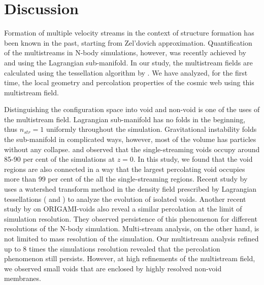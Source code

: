 \section{Discussion}
\label{sec:discussion}


Formation of multiple velocity streams in the context of structure formation has been known in the past, starting from Zel'dovich approximation. Quantification of the multistreams in N-body simulations, however, was recently achieved by \cite{Shandarin2012} and \cite{Abel2012} using the Lagrangian sub-manifold. In our study, the multistream fields are calculated using the tessellation algorithm by \cite{Shandarin2012}. We have analyzed, for the first time, the local geometry and percolation properties of the cosmic web using this multistream field.   

Distinguishing the configuration space into void and non-void is one of the uses of the multistream field. Lagrangian sub-manifold has no folds in the beginning, thus $n_{str} = 1$ uniformly throughout the simulation. Gravitational instability folds the sub-manifold in complicated ways, however, most of the volume has particles without any collapse. \cite{Shandarin2012} and \cite{Ramachandra2015} observed that the single-streaming voids occupy around 85-90 per cent of the simulations at $z=0$. In this study, we found that the void regions are also connected in a way that the largest percolating void occupies more than 99 per cent of the all the single-streaming regions. Recent study by \cite{Wojtak2016a} uses a watershed transform method in the density field prescribed by Lagrangian tessellations (\citealt{Shandarin2012} and \citealt{Abel2012}) to analyze the evolution of isolated voids. Another recent study by \cite{Falck2015} on ORIGAMI-voids also reveal a similar percolation at the limit of simulation resolution. They observed persistence of this phenomenon for different resolutions of the N-body simulation. Multi-stream analysis, on the other hand, is not limited to mass resolution of the simulation. Our multistream analysis refined up to 8 times the simulations resolution revealed that the percolation phenomenon still persists. However, at high refinements of the multistream field, we observed small voids that are enclosed by highly resolved non-void membranes. 

